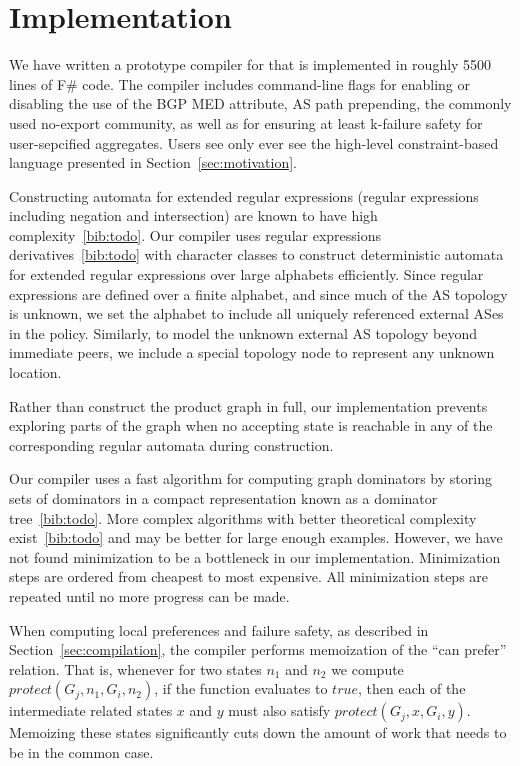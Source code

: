 \section{Implementation}

We have written a prototype compiler for \sysname that is implemented in roughly 5500 lines of F\# code. The compiler includes command-line flags for enabling or disabling the use of the BGP MED attribute, AS path prepending, the commonly used no-export community, as well as for ensuring at least k-failure safety for user-sepcified aggregates. Users see only ever see the high-level constraint-based language presented in Section~\ref{sec:motivation}.


Constructing automata for extended regular expressions (regular expressions including negation and intersection) are known to have high complexity~\ref{bib:todo}. Our \sysname compiler uses regular expressions derivatives~\ref{bib:todo} with character classes to construct deterministic automata for extended regular expressions over large alphabets efficiently. Since regular expressions are defined over a finite alphabet, and since much of the AS topology is unknown, we set the alphabet to include all uniquely referenced external ASes in the policy. Similarly, to model the unknown external AS topology beyond immediate peers, we include a special topology node to represent any unknown location.

Rather than construct the product graph in full, our implementation prevents exploring parts of the graph when no accepting state is reachable in any of the corresponding regular automata during construction.


Our compiler uses a fast algorithm for computing graph dominators by storing sets of dominators in a compact representation known as a dominator tree~\ref{bib:todo}. More complex algorithms with better theoretical complexity exist~\ref{bib:todo} and may be better for large enough examples. However, we have not found minimization to be a bottleneck in our implementation. Minimization steps are ordered from cheapest to most expensive. All minimization steps are repeated until no more progress can be made.


When computing local preferences and failure safety, as described in Section~\ref{sec:compilation}, the compiler performs memoization of the ``can prefer'' relation. That is, whenever for two states $n_1$ and $n_2$ we compute $protect(G_j, n_1, G_i, n_2)$, if the function evaluates to $true$, then each of the intermediate related states $x$ and $y$ must also satisfy $protect(G_j, x, G_i, y)$. Memoizing these states significantly cuts down the amount of work that needs to be in the common case.

